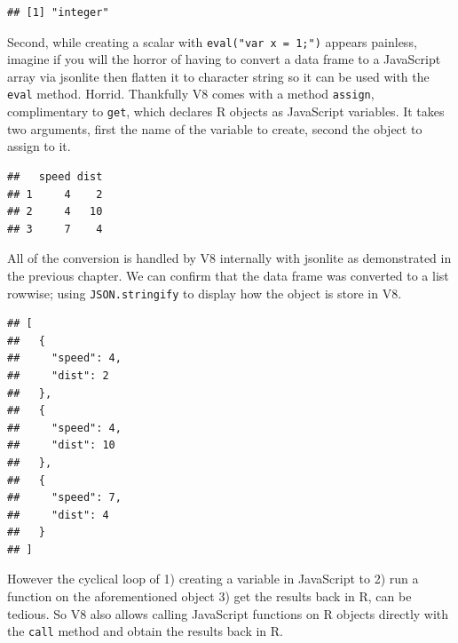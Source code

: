 \documentclass[
]{krantz}
\makeatletter
\newenvironment{Shaded}{\begin{snugshade}}{\end{snugshade}}
\newcommand{\CommentTok}[1]{\textcolor[rgb]{0.37,0.37,0.37}{\textit{#1}}}
\newcommand{\DecValTok}[1]{\textcolor[rgb]{0.06,0.06,0.06}{#1}}
\newcommand{\KeywordTok}[1]{\textcolor[rgb]{0.27,0.27,0.27}{\textbf{#1}}}
\newcommand{\NormalTok}[1]{#1}
\newcommand{\OperatorTok}[1]{\textcolor[rgb]{0.43,0.43,0.43}{\textbf{#1}}}
\newcommand{\StringTok}[1]{\textcolor[rgb]{0.5,0.5,0.5}{#1}}
\newenvironment{kframe}{%
\medskip{}
\setlength{\fboxsep}{.8em}
 \def\at@end@of@kframe{}%
 \ifinner\ifhmode%
  \def\at@end@of@kframe{\end{minipage}}%
  \begin{minipage}{\columnwidth}%
 \fi\fi%
 \def\FrameCommand##1{\hskip\@totalleftmargin \hskip-\fboxsep
 \colorbox{shadecolor}{##1}\hskip-\fboxsep
     \hskip-\linewidth \hskip-\@totalleftmargin \hskip\columnwidth}%
 \MakeFramed {\advance\hsize-\width
   \@totalleftmargin\z@ \linewidth\hsize
   \@setminipage}}%
 {\par\unskip\endMakeFramed%
 \at@end@of@kframe}
\renewenvironment{Shaded}{\begin{kframe}}{\end{kframe}}
\makeatother
\begin{document}
\begin{verbatim}
## [1] "integer"
\end{verbatim}

Second, while creating a scalar with \texttt{eval("var\ x\ =\ 1;")} appears painless, imagine if you will the horror of having to convert a data frame to a JavaScript array via jsonlite then flatten it to character string so it can be used with the \texttt{eval} method. Horrid. Thankfully V8 comes with a method \texttt{assign}, complimentary to \texttt{get}, which declares R objects as JavaScript variables. It takes two arguments, first the name of the variable to create, second the object to assign to it.

\begin{Shaded}
\end{Shaded}

\begin{verbatim}
##   speed dist
## 1     4    2
## 2     4   10
## 3     7    4
\end{verbatim}

All of the conversion is handled by V8 internally with jsonlite as demonstrated in the previous chapter. We can confirm that the data frame was converted to a list rowwise; using \texttt{JSON.stringify} to display how the object is store in V8.

\begin{Shaded}
\end{Shaded}

\begin{verbatim}
## [
##   {
##     "speed": 4,
##     "dist": 2
##   },
##   {
##     "speed": 4,
##     "dist": 10
##   },
##   {
##     "speed": 7,
##     "dist": 4
##   }
## ]
\end{verbatim}

However the cyclical loop of 1) creating a variable in JavaScript to 2) run a function on the aforementioned object 3) get the results back in R, can be tedious. So V8 also allows calling JavaScript functions on R objects directly with the \texttt{call} method and obtain the results back in R.
\end{document}
